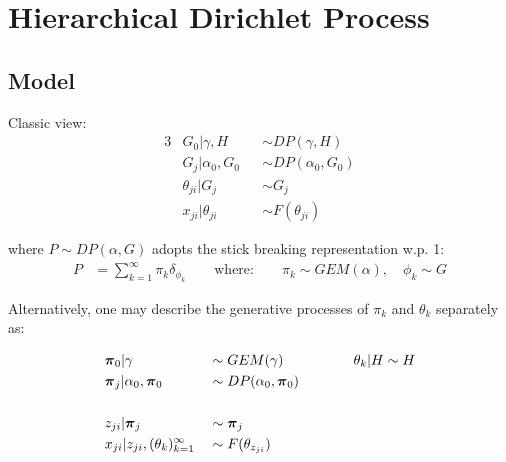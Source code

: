 \documentclass{article} %
\begin{document}

\clearpage
\appendix
{}

\section{Hierarchical Dirichlet Process}

\subsection{Model}

Classic view:
\begin{alignat*}{3}
& G_0 | \gamma, H && \sim DP(\gamma, H) \\
& G_j | \alpha_0, G_0 && \sim DP(\alpha_0, G_0) \\
& \theta_{ji} | G_j && \sim G_j \\
& x_{ji} | \theta_{ji} && \sim F(\theta_{ji})
\end{alignat*}

where $P \sim DP(\alpha, G)$ adopts the stick breaking representation w.p. 1:
\begin{align*}
P &= \sum_{k=1}^\infty \pi_k \delta_{\phi_k} \qquad \mbox{where:}
\qquad
\pi_k \sim GEM(\alpha), \quad \phi_k  \sim G
\end{align*}

Alternatively, one may describe the generative processes of $\pi_k$ and $\theta_k$ separately as:

\begin{alignat*}{3}
& \boldsymbol{\pi}_0 | \gamma && \sim GEM(\gamma)
\qquad\qquad && \theta_k | H \sim H
\\
& \boldsymbol{\pi}_j | \alpha_0, \boldsymbol{\pi}_0 && \sim DP(\alpha_0, \boldsymbol{\pi}_0) \\ \\
& z_{ji} | \boldsymbol{\pi}_j && \sim \boldsymbol{\pi}_j \\
&
x_{ji} | z_{ji}, (\theta_{k})_{k=1}^\infty && \sim F(\theta_{z_{ji}})
\end{alignat*}
\end{document}
